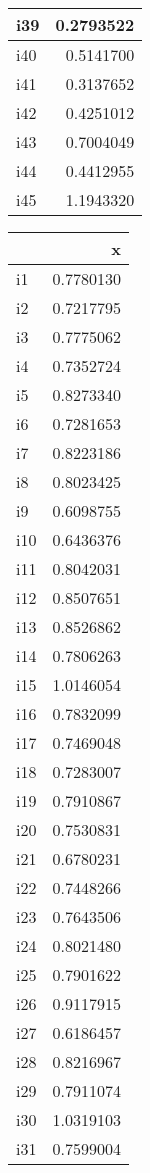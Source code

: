 \documentclass[
]{article}
\begin{document}
\begin{table}
\begin{tabular}[t]{l|r}
i39 & 0.2793522\\
\hline
i40 & 0.5141700\\
\hline
i41 & 0.3137652\\
\hline
i42 & 0.4251012\\
\hline
i43 & 0.7004049\\
\hline
i44 & 0.4412955\\
\hline
i45 & 1.1943320\\
\hline
\end{tabular}
\centering
\begin{tabular}[t]{l|r}
\hline
  & x\\
\hline
i1 & 0.7780130\\
\hline
i2 & 0.7217795\\
\hline
i3 & 0.7775062\\
\hline
i4 & 0.7352724\\
\hline
i5 & 0.8273340\\
\hline
i6 & 0.7281653\\
\hline
i7 & 0.8223186\\
\hline
i8 & 0.8023425\\
\hline
i9 & 0.6098755\\
\hline
i10 & 0.6436376\\
\hline
i11 & 0.8042031\\
\hline
i12 & 0.8507651\\
\hline
i13 & 0.8526862\\
\hline
i14 & 0.7806263\\
\hline
i15 & 1.0146054\\
\hline
i16 & 0.7832099\\
\hline
i17 & 0.7469048\\
\hline
i18 & 0.7283007\\
\hline
i19 & 0.7910867\\
\hline
i20 & 0.7530831\\
\hline
i21 & 0.6780231\\
\hline
i22 & 0.7448266\\
\hline
i23 & 0.7643506\\
\hline
i24 & 0.8021480\\
\hline
i25 & 0.7901622\\
\hline
i26 & 0.9117915\\
\hline
i27 & 0.6186457\\
\hline
i28 & 0.8216967\\
\hline
i29 & 0.7911074\\
\hline
i30 & 1.0319103\\
\hline
i31 & 0.7599004\\

\end{tabular}
\end{table}
\end{document}
